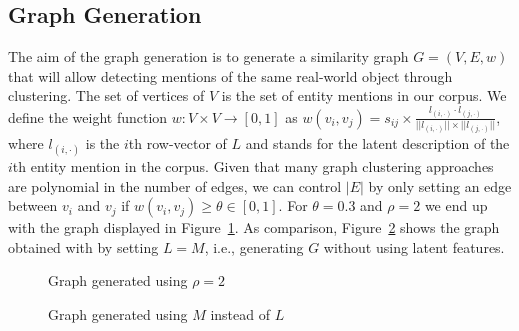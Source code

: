 \subsection{Graph Generation}
The aim of the graph generation is to generate a similarity graph $G = (V, E, w)$ that will allow detecting mentions of the same real-world object through clustering.
The set of vertices of $V$ is the set of entity mentions in our corpus.
We define the weight function $w: V \times V \rightarrow [0, 1]$ as $w(v_i, v_j) = s_{ij} \times \frac{l_{(i,\cdot)} \cdot l_{(j,\cdot)}}{||l_{(i,\cdot)}|| \times ||l_{(j,\cdot)}||}$, where $l_{(i,\cdot)}$ is the $i$th row-vector of $L$ and stands for the latent description of the $i$th entity mention in the corpus.
Given that many graph clustering approaches are polynomial in the number of edges, we can control $|E|$ by only setting an edge between $v_i$ and $v_j$ if $w(v_i, v_j) \geq \theta \in [0, 1]$.
For $\theta = 0.3$ and $\rho=2$ we end up with the graph displayed in Figure~\ref{fig:latent}. 
As comparison, Figure~\ref{fig:original} shows the graph obtained with by setting $L = M$, i.e., generating $G$ without using latent features.

\begin{figure}
\centering
\usetikzlibrary{arrows}

\caption{Graph generated using $\rho=2$}
\label{fig:latent}
\end{figure}

\begin{figure}
\centering
\usetikzlibrary{arrows}
\caption{Graph generated using $M$ instead of $L$}
\label{fig:original}
\end{figure}

